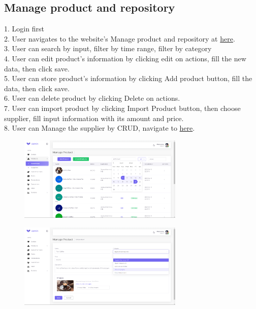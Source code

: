 \subsection{Manage product and repository}
1. Login first \\
2. User navigates to the website's Manage product and repository at \href{https://coffee.skrt.cc/admin/warehouse}{here}. \\
3. User can search by input, filter by time range, filter by category\\
4. User can edit product's information by clicking edit on actions, fill the new data, then click save.\\
5. User can store product's information by clicking Add product button, fill the data, then click save.\\
6. User can delete product by clicking Delete on actions.\\
7. User can import product by clicking Import Product button, then choose supplier, fill input information with its amount and price.\\
8. User can Manage the supplier by CRUD, navigate to  \href{https://coffee.skrt.cc/admin/supplier}{here}.\\
\begin{figure}[H]
    \centering
    \includegraphics[width=0.7\textwidth]{Demo/Screenshot_10.png}
    \label{fig:supportpage}
\end{figure}
\begin{figure}[H]
    \centering
    \includegraphics[width=0.7\textwidth]{Demo/Screenshot_11.png}
    \label{fig:supportpage}
\end{figure}
